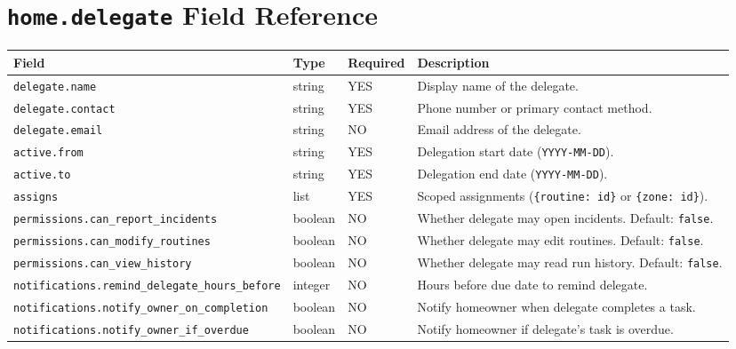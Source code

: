 \section{\texttt{home.delegate} Field Reference}
\label{sec:ref-delegate-fields}

\begin{center}
\small
\begin{tabular}{lllp{5.5cm}}
\textbf{Field} & \textbf{Type} & \textbf{Required} & \textbf{Description} \\
\hline
\texttt{delegate.name} & string & YES & Display name of the delegate. \\
\texttt{delegate.contact} & string & YES & Phone number or primary contact method. \\
\texttt{delegate.email} & string & NO & Email address of the delegate. \\
\texttt{active.from} & string & YES & Delegation start date (\texttt{YYYY-MM-DD}). \\
\texttt{active.to} & string & YES & Delegation end date (\texttt{YYYY-MM-DD}). \\
\texttt{assigns} & list & YES & Scoped assignments (\texttt{\{routine: id\}} or \texttt{\{zone: id\}}). \\
\texttt{permissions.can\_report\_incidents} & boolean & NO & Whether delegate may open incidents. Default: \texttt{false}. \\
\texttt{permissions.can\_modify\_routines} & boolean & NO & Whether delegate may edit routines. Default: \texttt{false}. \\
\texttt{permissions.can\_view\_history} & boolean & NO & Whether delegate may read run history. Default: \texttt{false}. \\
\texttt{notifications.remind\_delegate\_hours\_before} & integer & NO & Hours before due date to remind delegate. \\
\texttt{notifications.notify\_owner\_on\_completion} & boolean & NO & Notify homeowner when delegate completes a task. \\
\texttt{notifications.notify\_owner\_if\_overdue} & boolean & NO & Notify homeowner if delegate's task is overdue. \\
\end{tabular}
\end{center}

